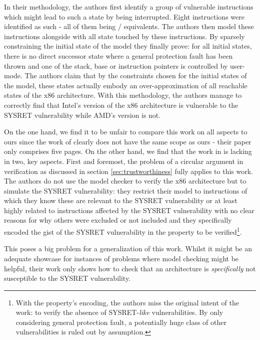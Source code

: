 In their methodology, the authors first identify a group of vulnerable instructions which might lead to such a state by being interrupted.
Eight instructions were identified as such - all of them being / equivalents.
The authors then model these instructions alongside with all state touched by these instructions.
By sparsely constraining the initial state of the model they finally prove: for all initial states, there is no direct successor state where a general protection fault has been thrown and one of the stack, base or instruction pointers is controlled by user-mode.
The authors claim that by the constraints chosen for the initial states of the model, these states actually embody an over-approximation of all reachable states of the x86 architecture.
With this methodology, the authors manage to correctly find that Intel's version of the x86 architecture is vulnerable to the SYSRET vulnerability while AMD's version is not.

On the one hand, we find it to be unfair to compare this work on all aspects to ours since the work of \citeauthor{BradfieldS16} clearly does not have the same scope as ours - their paper only comprises five pages.
On the other hand, we find that the work in \cite{BradfieldS16} is lacking in two, key aspects.
First and foremost, the problem of a circular argument in verification as discussed in section \ref{sec:trustworthiness} fully applies to this work.
The authors do not use the model checker to verify the x86 architecture but to simulate the SYSRET vulnerability: they restrict their model to instructions of which they know these are relevant to the SYSRET vulnerability or at least highly related to instructions affected by the SYSRET vulnerability with no clear reasons for why others were excluded or not included and they specifically encoded the gist of the SYSRET vulnerability in the property to be verified\footnote{%
    With the property's encoding, the authors miss the original intent of the work: to verify the absence of SYSRET-\textit{like} vulnerabilities.
    By only considering general protection fault, a potentially huge class of other vulnerabilities is ruled out by assumption.
}.

This poses a big problem for a generalization of this work.
Whilst it might be an adequate showcase for instances of problems where model checking might be helpful, their work only shows how to check that an architecture is \textit{specifically} not susceptible to the SYSRET vulnerability.

